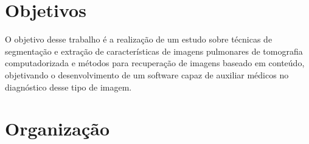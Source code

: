 \section{Objetivos}

O objetivo desse trabalho é a realização de um estudo sobre técnicas de segmentação e extração de características de imagens pulmonares de tomografia computadorizada e métodos para recuperação de imagens baseado em conteúdo, objetivando o desenvolvimento de um software capaz de auxiliar médicos no diagnóstico desse tipo de imagem.

\section{Organização}